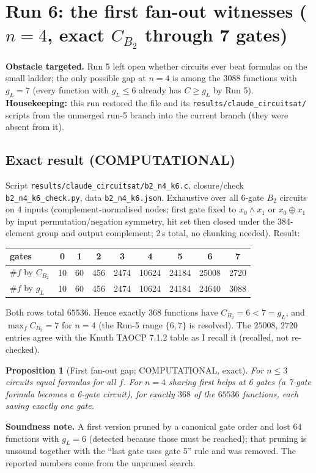 \documentclass[11pt]{article}
\newtheorem{prop}{Proposition}
\begin{document}
\section{Run 6: the first fan-out witnesses ($n=4$, exact $C_{B_2}$ through 7 gates)}\label{sec:r6}
\textbf{Obstacle targeted.} Run 5 left open whether circuits ever beat formulas on the small ladder; the only possible gap at $n=4$ is among the $3088$ functions with $g_L=7$ (every function with $g_L\le6$ already has $C\ge g_L$ by Run 5). \textbf{Housekeeping:} this run restored the file and its \texttt{results/claude\_circuitsat/} scripts from the unmerged run-5 branch into the current branch (they were absent from it).

\subsection{Exact result (COMPUTATIONAL)}
Script \texttt{results/claude\_circuitsat/b2\_n4\_k6.c}, closure/check \texttt{b2\_n4\_k6\_check.py}, data \texttt{b2\_n4\_k6.json}. Exhaustive over all 6-gate $B_2$ circuits on 4 inputs (complement-normalised nodes; first gate fixed to $x_0\wedge x_1$ or $x_0\oplus x_1$ by input permutation/negation symmetry, hit set then closed under the 384-element group and output complement; $2$\,s total, no chunking needed). Result:
\begin{center}\begin{tabular}{@{}lcccccccc@{}}\toprule
gates & 0&1&2&3&4&5&6&7\\\midrule
$\#f$ by $C_{B_2}$ & 10&60&456&2474&10624&24184&25008&2720\\
$\#f$ by $g_L$ & 10&60&456&2474&10624&24184&24640&3088\\\bottomrule\end{tabular}\end{center}
Both rows total $65536$. Hence exactly $368$ functions have $C_{B_2}=6<7=g_L$, and $\max_f C_{B_2}=7$ for $n=4$ (the Run-5 range $\{6,7\}$ is resolved). The $25008,\,2720$ entries agree with the Knuth TAOCP 7.1.2 table as I recall it (recalled, not re-checked).
\begin{prop}[First fan-out gap; COMPUTATIONAL, exact] For $n\le3$ circuits equal formulas for all $f$. For $n=4$ sharing first helps at 6 gates (a 7-gate formula becomes a 6-gate circuit), for exactly $368$ of the $65536$ functions, each saving exactly one gate.
\end{prop}
\textbf{Soundness note.} A first version pruned by a canonical gate order and lost $64$ functions with $g_L=6$ (detected because those must be reached); that pruning is unsound together with the ``last gate uses gate 5'' rule and was removed. The reported numbers come from the unpruned search.
\end{document}
